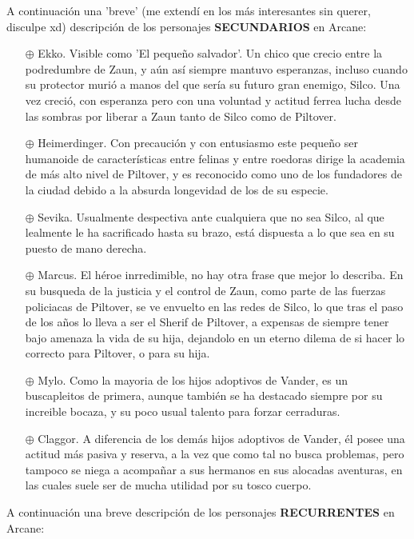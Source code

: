 \documentclass[11pt,a5paper]{article}
\begin{document}
A continuación una 'breve' (me extendí en los más interesantes sin querer, disculpe xd) descripción de los personajes {\textbf{SECUNDARIOS}} en Arcane:

\begin{itemize}
    \item[$\oplus$] Ekko. Visible como 'El pequeño salvador'. Un chico que crecio entre la podredumbre de Zaun, y aún así siempre mantuvo esperanzas, incluso cuando su protector murió a manos del que sería su futuro gran enemigo, Silco. Una vez creció, con esperanza pero con una voluntad y actitud ferrea lucha desde las sombras por liberar a Zaun tanto de Silco como de Piltover.
    \item[$\oplus$] Heimerdinger. Con precaución y con entusiasmo este pequeño ser humanoide de características entre felinas y entre roedoras dirige la academia de más alto nivel de Piltover, y es reconocido como uno de los fundadores de la ciudad debido a la absurda longevidad de los de su especie.
    \item[$\oplus$] Sevika. Usualmente despectiva ante cualquiera que no sea Silco, al que lealmente le ha sacrificado hasta su brazo, está dispuesta a lo que sea en su puesto de mano derecha.
    \item[$\oplus$] Marcus. El héroe inrredimible, no hay otra frase que mejor lo describa. En su busqueda de la justicia y el control de Zaun, como parte de las fuerzas policiacas de Piltover, se ve envuelto en las redes de Silco, lo que tras el paso de los años lo lleva a ser el Sherif de Piltover, a expensas de siempre tener bajo amenaza la vida de su hija, dejandolo en un eterno dilema de si hacer lo correcto para Piltover, o para su hija.
    \item[$\oplus$] Mylo. Como la mayoria de los hijos adoptivos de Vander, es un buscapleitos de primera, aunque también se ha destacado siempre por su increible bocaza, y su poco usual talento para forzar cerraduras.
    \item[$\oplus$] Claggor. A diferencia de los demás hijos adoptivos de Vander, él posee una actitud más pasiva y reserva, a la vez que como tal no busca problemas, pero tampoco se niega a acompañar a sus hermanos en sus alocadas aventuras, en las cuales suele ser de mucha utilidad por su tosco cuerpo.
\end{itemize}

A continuación una breve descripción de los personajes {\textbf{RECURRENTES}} en Arcane:
\end{document}
